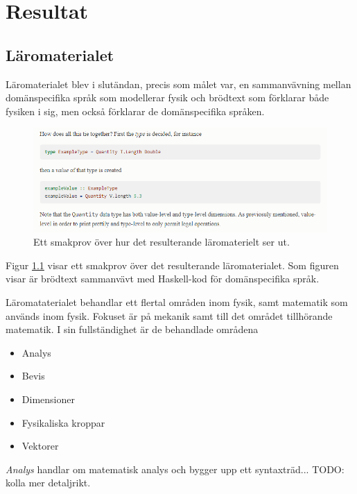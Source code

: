 
\chapter{Resultat}

\begin{binge}

\section{Läromaterialet}

Läromaterialet blev i slutändan, precis som målet var, en sammanvävning mellan domänspecifika språk som modellerar fysik och brödtext som förklarar både fysiken i sig, men också förklarar de domänspecifika språken.

\begin{figure}
  \includegraphics[width=\linewidth]{figure/smakprov_laromaterial.png}
  \caption{Ett smakprov över hur det resulterande läromaterielt ser ut.}
  \label{fig:smakprov_laromaterial}
\end{figure}

Figur \ref{fig:smakprov_laromaterial} visar ett smakprov över det resulterande läromaterialet. Som figuren visar är brödtext sammanvävt med Haskell-kod för domänspecifika språk.

Läromataterialet behandlar ett flertal områden inom fysik, samt matematik som används inom fysik. Fokuset är på mekanik samt till det området tillhörande matematik. I sin fullständighet är de behandlade områdena

\begin{itemize}
  \item Analys
  \item Bevis
  \item Dimensioner
  \item Fysikaliska kroppar
  \item Vektorer
\end{itemize}

\textit{Analys} handlar om matematisk analys och bygger upp ett syntaxträd... TODO: kolla mer detaljrikt.


\end{binge}
